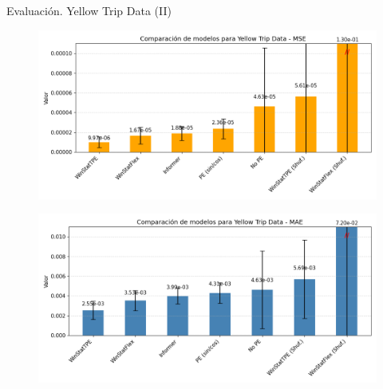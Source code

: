 \documentclass[compress]{beamer}
\begin{document}
	\begin{frame}{Evaluación. Yellow Trip Data (II)}
			\begin{figure}
			\includegraphics[scale=0.26]{pic/taxifinalmse.png}
		\end{figure}
		
		\begin{figure}
			\includegraphics[scale=0.26]{pic/taxifinalmae.png}
		\end{figure}
	\end{frame}
\end{document}
